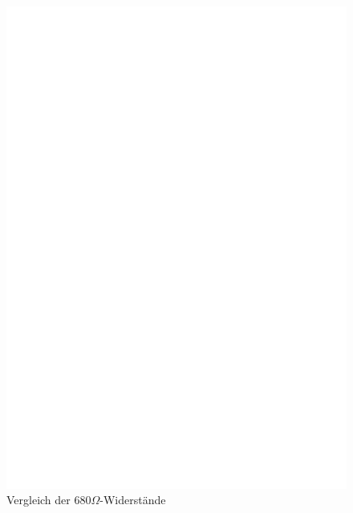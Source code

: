 \begin{enumerate}
\begin{figure}[H]
\centering
\includegraphics[width=17cm]{../FIG/Test2.eps}
\caption{Vergleich der \(680\Omega\)-Widerstände }
\label{fig:test2}
\end{figure}


\end{enumerate}
